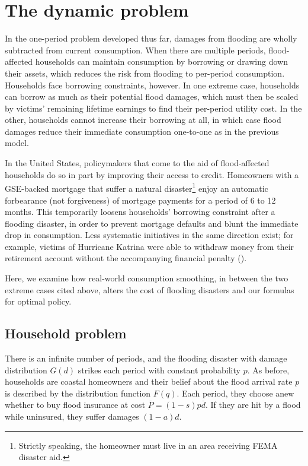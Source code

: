 \documentclass[12pt]{article}
\begin{document}
\section{The dynamic problem}
\label{sec:dynamic}

In the one-period problem developed thus far, damages from flooding are wholly subtracted from current consumption. When there are multiple periods, flood-affected households can maintain consumption by borrowing or drawing down their assets, which reduces the risk from flooding to per-period consumption. Households face borrowing constraints, however. In one extreme case, households can borrow as much as their potential flood damages, which must then be scaled by victims' remaining lifetime earnings to find their per-period utility cost. In the other, households cannot increase their borrowing at all, in which case flood damages reduce their immediate consumption one-to-one as in the previous model. 

In the United States, policymakers that come to the aid of flood-affected households do so in part by improving their access to credit. Homeowners with a GSE-backed mortgage that suffer a natural disaster\footnote{Strictly speaking, the homeowner must live in an area receiving FEMA disaster aid.} enjoy an automatic forbearance (not forgiveness) of mortgage payments for a period of 6 to 12 months. This temporarily loosens households' borrowing constraint after a flooding disaster, in order to prevent mortgage defaults and blunt the immediate drop in consumption. Less systematic initiatives in the same direction exist; for example, victims of Hurricane Katrina were able to withdraw money from their retirement account without the accompanying financial penalty (\cite{deryugina2018economic}). 

Here, we examine how real-world consumption smoothing, in between the two extreme cases cited above, alters the cost of flooding disasters and our formulas for optimal policy.   


\subsection{Household problem}

There is an infinite number of periods, and the flooding disaster with damage distribution $G(d)$ strikes each period with constant probability $p$. As before, households are coastal homeowners and their belief about the flood arrival rate $p$ is described by the distribution function $F(q)$. Each period, they choose anew whether to buy flood insurance at cost $\overline{P}=(1-s)p\overline{d}$. If they are hit by a flood while uninsured, they suffer damages $(1-a)d$.
\end{document}
